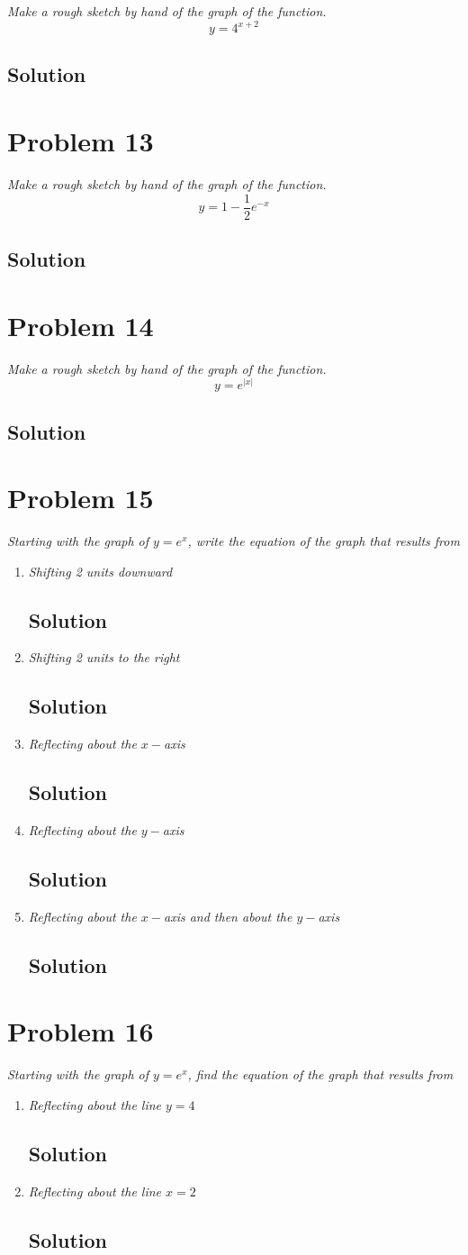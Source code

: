 \documentclass[11pt]{article}
\newcommand{\soln}{\subsection*}
\newcommand{\qn}{\textit}
\begin{document}
\qn{Make a rough sketch by hand of the graph of the function. $$y=4^{x+2}$$}

\soln{Solution}

\section*{Problem 13}

\qn{Make a rough sketch by hand of the graph of the function. $$y=1-\frac{1}{2}e^{-x}$$}

\soln{Solution}

\section*{Problem 14}

\qn{Make a rough sketch by hand of the graph of the function. $$y=e^{|x|}$$}

\soln{Solution}

\section*{Problem 15}

\qn{Starting with the graph of $y=e^x$, write the equation of the graph that results from}

\begin{enumerate}
	\item \qn{Shifting 2 units downward}
	\soln{Solution}
	
	\item \qn{Shifting 2 units to the right}
	\soln{Solution}
	
	\item \qn{Reflecting about the $x-$axis}
	\soln{Solution}
	
	\item \qn{Reflecting about the $y-$axis}
	\soln{Solution}
	
	\item \qn{Reflecting about the $x-$axis and then about the $y-$axis}
	\soln{Solution}
\end{enumerate}

\section*{Problem 16}

\qn{Starting with the graph of $y=e^x$, find the equation of the graph that results from}

\begin{enumerate}
	\item \qn{Reflecting about the line $y=4$}
	\soln{Solution}
	
	\item \qn{Reflecting about the line $x=2$}
	\soln{Solution}
\end{enumerate}
\end{document}

